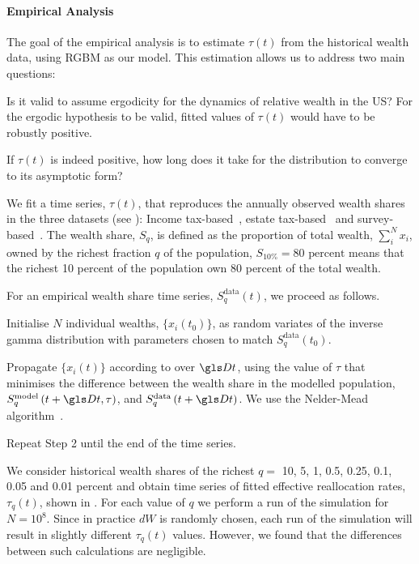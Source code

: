\paragraph{Empirical Analysis}\label{sec:analysis}
The goal of the empirical analysis is to estimate $\tau\left(t\right)$ from the historical wealth data, using RGBM as our model. This estimation allows us to address two main questions:

\bi
\item[1.] Is it valid to assume ergodicity for the dynamics of relative wealth in the US? For the ergodic hypothesis to be valid, fitted values of $\tau\left(t\right)$ would have to be robustly positive.
\item[2.] If $\tau\left(t\right)$ is indeed positive, how long does it take for the distribution to converge to its asymptotic form?
\ei

We fit a time series, $\tau\left(t\right)$, that reproduces the annually observed wealth shares in the three datasets (see ): Income tax-based~\cite{SaezZucman2014,WID2017}, estate tax-based~\cite{kopczuk2004top} and survey-based~\cite{bricker2016measuring2}. The wealth share, $S_q$, is defined as the proportion of total wealth, $\sum_i^N x_i$, owned by the richest fraction $q$ of the population, \eg $S_{10\%}=80 \text{ percent}$ means that the richest 10 percent of the population own 80 percent of the total wealth.

For an empirical wealth share time series, $S^{\text{data}}_q\left(t\right)$, we proceed as follows.

\bi
\item[ -- Step 1]
Initialise $N$ individual wealths, $\{x_i\left(t_0\right)\}$, as random variates of the inverse gamma distribution with parameters chosen to match $S^{\text{data}}_q\left(t_0\right)$.
\item[ -- Step 2]
Propagate $\{x_i\left(t\right)\}$ according to  over $\Dt$,
using the value of $\tau$ that minimises the difference between the wealth share in the modelled population, $S^{\text{model}}_q\left(t+\Dt, \tau\right)$, and $S^{\text{data}}_q\left(t+\Dt\right)$. We use the Nelder-Mead algorithm~\cite{NelderMead1965}.
\item[ -- Step 3]
Repeat Step 2 until the end of the time series.
\ei

We consider historical wealth shares of the richest $q=$ 10, 5, 1, 0.5, 0.25, 0.1, 0.05 and 0.01 percent and obtain time series of fitted effective reallocation rates, $\tau_q\left(t\right)$, shown in .
For each value of $q$ we perform a run of the simulation for $N=10^8$. Since in practice $dW$ is randomly chosen, each run of the simulation will result in slightly different $\tau_q\left(t\right)$ values. However, we found that the differences between such calculations are negligible. 

